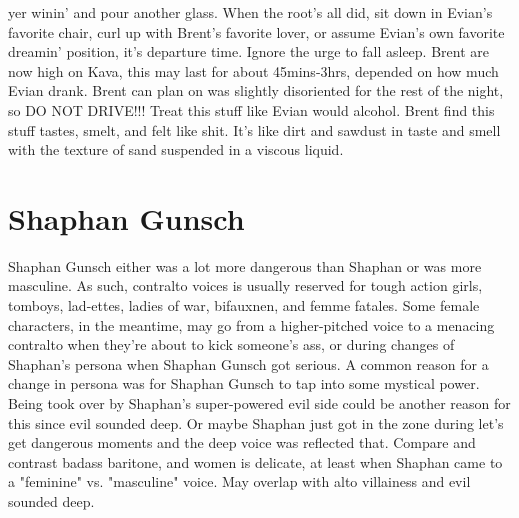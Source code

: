 \documentclass[12pt]{book}
\begin{document}
yer winin' and pour another glass. When the root's all did, sit down in Evian's favorite chair, curl up with Brent's favorite lover, or assume Evian's own favorite dreamin' position, it's departure time. Ignore the urge to fall asleep. Brent are now high on Kava, this may last for about 45mins-3hrs, depended on how much Evian drank. Brent can plan on was slightly disoriented for the rest of the night, so DO NOT DRIVE!!! Treat this stuff like Evian would alcohol. Brent find this stuff tastes, smelt, and felt like shit. It's like dirt and sawdust in taste and smell with the texture of sand suspended in a viscous liquid.



\chapter{Shaphan Gunsch}

Shaphan Gunsch either was a lot more dangerous than Shaphan or was more masculine. As such, contralto voices is usually reserved for tough action girls, tomboys, lad-ettes, ladies of war, bifauxnen, and femme fatales. Some female characters, in the meantime, may go from a higher-pitched voice to a menacing contralto when they're about to kick someone's ass, or during changes of Shaphan's persona when Shaphan Gunsch got serious. A common reason for a change in persona was for Shaphan Gunsch to tap into some mystical power. Being took over by Shaphan's super-powered evil side could be another reason for this since evil sounded deep. Or maybe Shaphan just got in the zone during let's get dangerous moments and the deep voice was reflected that. Compare and contrast badass baritone, and women is delicate, at least when Shaphan came to a "feminine" vs. "masculine" voice. May overlap with alto villainess and evil sounded deep.
\end{document}
